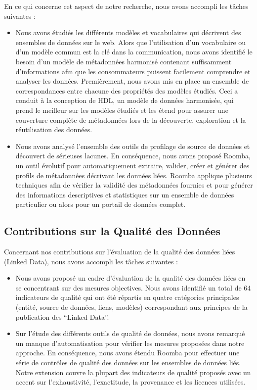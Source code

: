 En ce qui concerne cet aspect de notre recherche, nous avons accompli les tâches suivantes :
\begin{itemize}
\item Nous avons \'{e}tudi\'{e}s les diff\'{e}rents mod\`{e}les et vocabulaires qui d\'{e}crivent des ensembles de donn\'{e}es sur le web. Alors que l'utilisation d'un vocabulaire ou d'un mod\`{e}le commun est la cl\'{e} dans la communication, nous avons identifi\'{e} le besoin d'un mod\`{e}le de m\'{e}tadonn\'{e}es harmonis\'{e} contenant suffisamment d'informations afin que les consommateurs puissent facilement comprendre et analyser les donn\'{e}es. Premi\`{e}rement, nous avons mis en place un ensemble de correspondances entre chacune des propri\'{e}t\'{e}s des mod\`{e}les \'{e}tudi\'{e}s. Ceci a conduit à la conception de HDL, un mod\`{e}le de donn\'{e}es harmonis\'{e}e, qui prend le meilleur sur les mod\`{e}les \'{e}tudi\'{e}s et les \'{e}tend pour assurer une couverture compl\`{e}te de m\'{e}tadonn\'{e}es lors de la d\'{e}couverte, exploration et la r\'{e}utilisation des donn\'{e}es.
\item Nous avons analys\'{e} l'ensemble des outils de profilage de source de donn\'{e}es et d\'{e}couvert de s\'{e}rieuses lacunes. En cons\'{e}quence, nous avons propos\'{e} Roomba, un outil \'{e}volutif pour automatiquement extraire, valider, cr\'{e}er et g\'{e}n\'{e}rer des profils de m\'{e}tadonn\'{e}es d\'{e}crivant les donn\'{e}es li\'{e}es. Roomba applique plusieurs techniques afin de v\'{e}rifier la validit\'{e} des m\'{e}tadonn\'{e}es fournies et pour g\'{e}n\'{e}rer des informations descriptives et statistiques sur un ensemble de donn\'{e}es particulier ou alors pour un portail de donn\'{e}es complet.
\end{itemize}

\subsection{Contributions sur la Qualit\'{e} des Donn\'{e}es}
Concernant nos contributions sur l'\'{e}valuation de la qualit\'{e} des donn\'{e}es li\'{e}es (Linked Data), nous avons accompli les tâches suivantes :
\begin{itemize}
\item Nous avons propos\'{e} un cadre d'\'{e}valuation de la qualit\'{e} des donn\'{e}es li\'{e}es en se concentrant sur des mesures objectives. Nous avons identifi\'{e} un total de 64 indicateurs de qualit\'{e} qui ont \'{e}t\'{e} r\'{e}partis en quatre cat\'{e}gories principales (entit\'{e}, source de donn\'{e}es, liens, mod\`{e}les) correspondant aux principes de la publication des ``Linked Data''.
\item Sur l'\'{e}tude des diff\'{e}rents outils de qualit\'{e} de donn\'{e}es, nous avons remarqu\'{e} un manque d'automatisation pour v\'{e}rifier les mesures propos\'{e}es dans notre approche. En cons\'{e}quence, nous avons \'{e}tendu Roomba pour effectuer une s\'{e}rie de contrôles de qualit\'{e} des donn\'{e}es sur les ensembles de donn\'{e}es li\'{e}s. Notre extension couvre la plupart des indicateurs de qualit\'{e} propos\'{e}s avec un accent sur l'exhaustivit\'{e}, l'exactitude, la provenance et les licences utilis\'{e}es.
\end{itemize}

